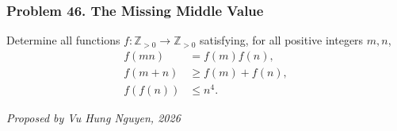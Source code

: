 \subsubsection*{Problem 46. The Missing Middle Value}

\begin{exercisebox}[hard]

Determine all functions $f:\mathbb Z_{>0}\to\mathbb Z_{>0}$ satisfying, for all positive integers $m,n$,
\[
\boxed{
\begin{aligned}
f(mn)&=f(m)f(n),\\
f(m+n)&\ge f(m)+f(n),\\
f(f(n))&\le n^4.
\end{aligned}}
\]

\begin{flushright}
\textit{Proposed by Vu Hung Nguyen, 2026}
\end{flushright}


\end{exercisebox}
